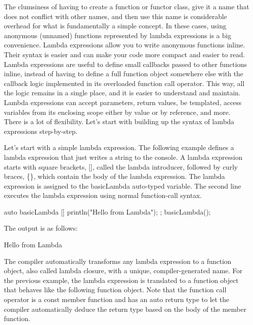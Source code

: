 
The clumsiness of having to create a function or functor class, give it a name that does not conflict with other names, and then use this name is considerable overhead for what is fundamentally a simple concept. In these cases, using anonymous (unnamed) functions represented by lambda expressions is a big convenience. Lambda expressions allow you to write anonymous functions inline. Their syntax is easier and can make your code more compact and easier to read. Lambda expressions are useful to define small callbacks passed to other functions inline, instead of having to define a full function object somewhere else with the callback logic implemented in its overloaded function call operator. This way, all the logic remains in a single place, and it is easier to understand and maintain. Lambda expressions can accept parameters, return values, be templated, access variables from its enclosing scope either by value or by reference, and more. There is a lot of flexibility. Let’s start with building up the syntax of lambda expressions step-by-step.


Let’s start with a simple lambda expression. The following example defines a lambda expression that just writes a string to the console. A lambda expression starts with square brackets, [], called the lambda introducer, followed by curly braces, \{\}, which contain the body of the lambda expression. The lambda expression is assigned to the basicLambda auto-typed variable. The second line executes the lambda expression using normal function-call syntax.

\begin{cpp}
auto basicLambda { []{ println("Hello from Lambda"); } };
basicLambda();
\end{cpp}

The output is as follows:

\begin{shell}
Hello from Lambda
\end{shell}

The compiler automatically transforms any lambda expression to a function object, also called lambda closure, with a unique, compiler-generated name. For the previous example, the lambda expression is translated to a function object that behaves like the following function object. Note that the function call operator is a const member function and has an auto return type to let the compiler automatically deduce the return type based on the body of the member function.

